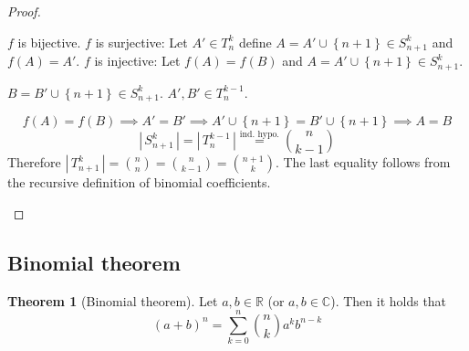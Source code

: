 \documentclass[a4paper,landscape,twocolumn]{article}
\theoremstyle{definition}
\newtheorem{theorem}{Theorem}
\newcommand\set[1]{\left\{#1\right\}}
\newcommand\card[1]{\left|\,#1\,\right|}
\begin{document}
\begin{proof}
\begin{description}
      $f$ is bijective.
      $f$ is surjective: Let $A' \in T_n^k$ define $A = A' \cup \set{n+1} \in S_{n+1}^k$ and $f(A) = A'$.
      $f$ is injective: Let $f(A) = f(B)$ and $A = A' \cup \set{n+1} \in S_{n+1}^k$.

      $B = B' \cup \set{n+1} \in S_{n+1}^k$. $A', B' \in T_n^{k-1}$.

      \[ f(A) = f(B) \implies A' = B' \implies A' \cup \set{n+1} = B' \cup \set{n+1} \implies A = B \]
      \[ \card{S_{n+1}^k} = \card{T_n^{k-1}} \stackrel{\text{ind. hypo.}}{=} \binom{n}{k-1} \]
      Therefore $\card{T_{n+1}^k} = \binom nn = \binom n{k-1} = \binom{n+1}{k}$.
      The last equality follows from the recursive definition of binomial coefficients.
  \end{description}
\end{proof}

\subsection{Binomial theorem}
\begin{theorem}[Binomial theorem]
  Let $a, b \in \mathbb{R}$ (or $a, b \in \mathbb{C}$). Then it holds that
  \[ (a + b)^n = \sum_{k=0}^n \binom{n}{k} a^k b^{n-k} \]
\end{theorem}
\end{document}
